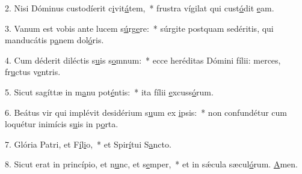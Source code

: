 2. Nisi Dóminus custodíerit c\uline{i}vit\uline{á}tem,~* frustra vígilat qui cust\uline{ó}dit \uline{e}am.\par 
3. Vanum est vobis ante lucem s\uline{ú}rg\uline{e}re:~* súrgite postquam sedéritis, qui manducátis p\uline{a}nem dol\uline{ó}ris.\par 
4. Cum déderit diléctis s\uline{u}is s\uline{o}mnum:~* ecce heréditas Dómini fílii: merces, fr\uline{u}ctus v\uline{e}ntris.\par 
5. Sicut sagíttæ in m\uline{a}nu pot\uline{é}ntis:~* ita fílii \uline{e}xcuss\uline{ó}rum.\par 
6. Beátus vir qui implévit desidérium s\uline{u}um ex \uline{i}psis:~* non confundétur cum loquétur inimícis s\uline{u}is in p\uline{o}rta.\par 
7. Glória Patri, et F\uline{í}l\uline{i}o,~* et Spir\uline{í}tui S\uline{a}ncto.\par 
8. Sicut erat in princípio, et n\uline{u}nc, et s\uline{e}mper,~* et in sǽcula sæcul\uline{ó}rum. \uline{A}men.\par 
